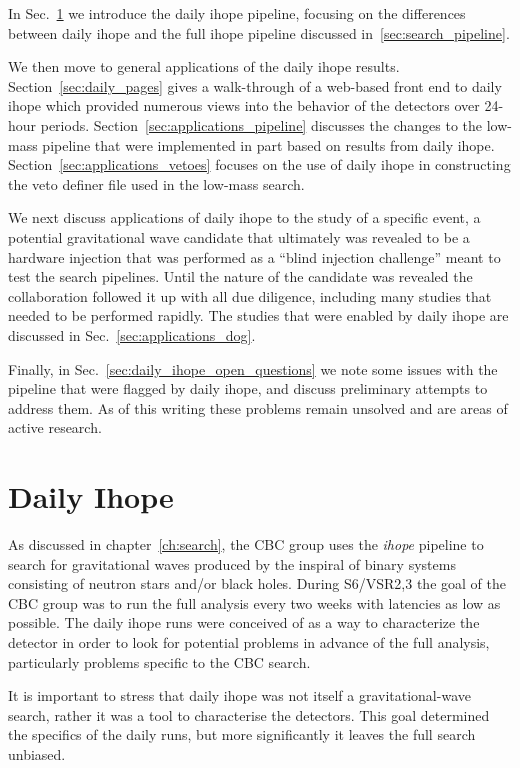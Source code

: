 In Sec.~\ref{sec:daily_ihope} we introduce the daily ihope
pipeline, focusing on the differences between daily ihope and the full
ihope pipeline discussed in~\ref{sec:search_pipeline}.

We then move to general applications of the daily ihope results.
Section~\ref{sec:daily_pages} gives a walk-through of a web-based
front end to daily ihope which provided numerous views into the
behavior of the detectors over 24-hour periods.  
Section~\ref{sec:applications_pipeline} discusses the changes to the
low-mass pipeline that were implemented in part based on results from
daily ihope.  Section~\ref{sec:applications_vetoes} focuses on the use
of daily ihope in constructing the veto definer file used in the
low-mass search.

We next discuss applications of daily ihope to the study of a specific
event, a potential gravitational wave candidate that ultimately was
revealed to be a hardware injection that was performed as a ``blind
injection challenge'' meant to test the search pipelines.  Until the
nature of the candidate was revealed the collaboration followed it up
with all due diligence, including many studies that needed to be
performed rapidly.  The studies that were enabled by daily ihope are
discussed in Sec.~\ref{sec:applications_dog}.

Finally, in Sec.~\ref{sec:daily_ihope_open_questions} we note some
issues with the pipeline that were flagged by daily ihope, and discuss
preliminary attempts to address them.  As of this writing these
problems remain unsolved and are areas of active research.



\section{Daily Ihope}
\label{sec:daily_ihope}

As discussed in chapter~\ref{ch:search}, the CBC group uses the
\emph{ihope} pipeline to search for gravitational waves produced by
the inspiral of binary systems consisting of neutron stars and/or
black holes.  During S6/VSR2,3 the goal of the CBC group was to run
the full analysis every two weeks with latencies as low as possible.
The daily ihope runs were conceived of as a way to characterize the
detector in order to look for potential problems in advance of the
full analysis, particularly problems specific to the CBC search.

It is important to stress that daily ihope was not itself a
gravitational-wave search, rather it was a tool to characterise the
detectors.  This goal determined the specifics of the daily runs, but
more significantly it leaves the full search unbiased.

